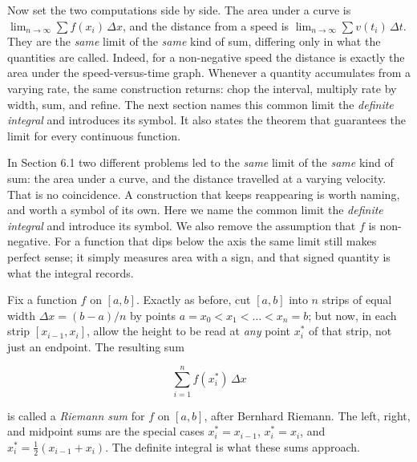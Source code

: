 \documentclass[a4paper,12pt,oneside]{memoir}
\begin{document}
Now set the two computations side by side. The area under a curve is \(\lim_{n\to\infty}\sum f(x_{i})\,\Delta x\), and the distance from a speed is \(\lim_{n\to\infty}\sum v(t_{i})\,\Delta t\). They are the \emph{same} limit of the \emph{same} kind of sum, differing only in what the quantities are called. Indeed, for a non-negative speed the distance is exactly the area under the speed-versus-time graph. Whenever a quantity accumulates from a varying rate, the same construction returns: chop the interval, multiply rate by width, sum, and refine. The next section names this common limit the \emph{definite integral} and introduces its symbol. It also states the theorem that guarantees the limit for every continuous function.


In Section 6.1 two different problems led to the \emph{same} limit of the \emph{same} kind of sum: the area under a curve, and the distance travelled at a varying velocity. That is no coincidence. A construction that keeps reappearing is worth naming, and worth a symbol of its own. Here we name the common limit the \emph{definite integral} and introduce its symbol. We also remove the assumption that \(f\) is non-negative. For a function that dips below the axis the same limit still makes perfect sense; it simply measures area with a sign, and that signed quantity is what the integral records.

Fix a function \(f\) on \([a, b]\). Exactly as before, cut \([a, b]\) into \(n\) strips of equal width \(\Delta x = (b - a)/n\) by points \(a = x_{0} < x_{1} < \dots < x_{n} = b\); but now, in each strip \([x_{i-1}, x_{i}]\), allow the height to be read at \emph{any} point \(x_{i}^{*}\) of that strip, not just an endpoint. The resulting sum

\[ \sum_{i=1}^{n} f(x_{i}^{*})\,\Delta x \]

is called a \emph{Riemann sum} for \(f\) on \([a, b]\), after Bernhard Riemann. The left, right, and midpoint sums are the special cases \(x_{i}^{*} = x_{i-1}\), \(x_{i}^{*} = x_{i}\), and \(x_{i}^{*} = \tfrac{1}{2}(x_{i-1} + x_{i})\). The definite integral is what these sums approach.
\end{document}
